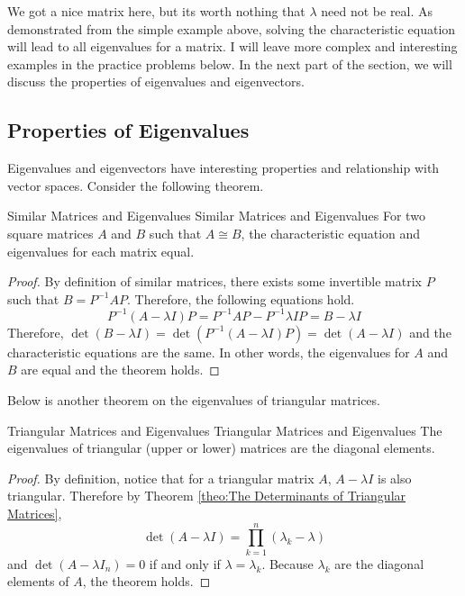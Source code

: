 \documentclass[../main.tex]{subfiles}
\begin{document}
We got a nice matrix here, but its worth nothing that $\lambda$ need
not be real. As demonstrated from the simple example above,
solving the characteristic equation will lead to all eigenvalues
for a matrix. I will leave more complex and interesting examples
in the practice problems below. In the next part of the section,
we will discuss the properties of eigenvalues and eigenvectors.

\subsection{Properties of Eigenvalues}

Eigenvalues and eigenvectors have interesting properties and
relationship with vector spaces. Consider the following theorem.

\begin{theorem}{Similar Matrices and Eigenvalues}
{Similar Matrices and Eigenvalues}
For two square matrices $A$ and $B$ such that $A \cong B$,
the characteristic equation and eigenvalues for each matrix equal.
\end{theorem}
\begin{proof}
By definition of similar matrices, there exists some invertible
matrix $P$ such that $B = P^{-1} A P$. Therefore, the following
equations hold.
\[
P^{-1} (A - \lambda I) P
= P^{-1} A P - P^{-1} \lambda I P
= B - \lambda I
\]
Therefore, $\det(B - \lambda I) = \det(P^{-1} (A - \lambda I) P)
= \det(A - \lambda I)$ and the characteristic equations are the
same. In other words, the eigenvalues for $A$ and $B$ are equal
and the theorem holds.
\end{proof}

Below is another theorem on the eigenvalues of triangular matrices.

\begin{theorem}{Triangular Matrices and Eigenvalues}
{Triangular Matrices and Eigenvalues}
The eigenvalues of triangular (upper or lower) matrices are the
diagonal elements.
\end{theorem}
\begin{proof}
By definition, notice that for a triangular matrix $A$,
$A - \lambda I$ is also triangular. Therefore by Theorem
\ref{theo:The Determinants of Triangular Matrices},
\[
\det(A - \lambda I)
= \prod_{k=1}^n (\lambda_k - \lambda)
\]
and $\det(A - \lambda I_n) = 0$ if and only if $\lambda = \lambda_k$.
Because $\lambda_k$ are the diagonal elements of $A$, the theorem
holds.
\end{proof}
\end{document}
